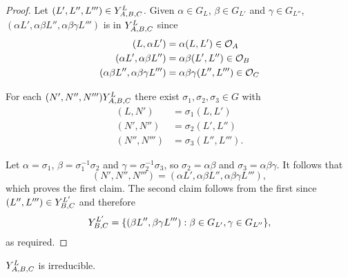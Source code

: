 \documentclass[a4paper, 11pt]{report}
\begin{document}
\begin{proof}
Let $(L',L'',L''')\in\yprod[L]{A,B,C}$. Given $\alpha\in G_{L}$, $\beta\in G_{L'}$ and $\gamma\in G_{L''}$, $(\alpha L',\alpha\beta L'', \alpha\beta\gamma L''')$ is in $\yprod[L]{A,B,C}$ since
\begin{align*}
(L,\alpha L') &= \alpha (L,L')\in\orbit{A}\\
(\alpha L', \alpha\beta L'') &= \alpha\beta (L',L'')\in\orbit{B}\\
(\alpha\beta L'',\alpha\beta\gamma L''') &= \alpha\beta\gamma (L'',L''')\in\orbit{C}
\end{align*}

For each $(N',N'',N''')\yprod[L]{A,B,C}$ there exist $\sigma_1,\sigma_2,\sigma_3\in G$ with
\begin{align*}
(L,N') &= \sigma_1(L,L')\\
(N',N'') &= \sigma_2(L',L'')\\
(N'',N''') &= \sigma_3(L'',L''').
\end{align*}

Let $\alpha = \sigma_1$, $\beta = \sigma_1^{-1}\sigma_2$ and $\gamma = \sigma_2^{-1}\sigma_3$, so $\sigma_2=\alpha\beta$ and $\sigma_3=\alpha\beta\gamma$. It follows that
\begin{equation*}
(N',N'',N''') = (\alpha L',\alpha\beta L'', \alpha\beta\gamma L'''),
\end{equation*}
which proves the first claim. The second claim follows from the first since $(L'',L''')\in\yprod[L']{B,C}$ and therefore
\begin{equation*}
\yprod[L']{B,C} = \{(\beta L'',\beta\gamma L'''):\beta\in G_{L'}, \gamma\in G_{L''}\},
\end{equation*}
as required.
\end{proof}

\begin{proposition}\label{proposition:irreducible-y-triple}
$\yprod[L]{A,B,C}$ is irreducible.
\end{proposition}
\end{document}
